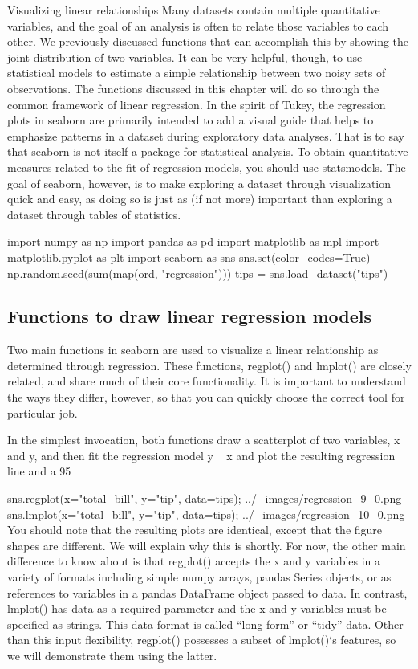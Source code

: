 Visualizing linear relationships
Many datasets contain multiple quantitative variables, and the goal of an analysis is often to relate those variables to each other. We previously discussed functions that can accomplish this by showing the joint distribution of two variables. It can be very helpful, though, to use statistical models to estimate a simple relationship between two noisy sets of observations. The functions discussed in this chapter will do so through the common framework of linear regression.
In the spirit of Tukey, the regression plots in seaborn are primarily intended to add a visual guide that helps to emphasize patterns in a dataset during exploratory data analyses. That is to say that seaborn is not itself a package for statistical analysis. To obtain quantitative measures related to the fit of regression models, you should use statsmodels. The goal of seaborn, however, is to make exploring a dataset through visualization quick and easy, as doing so is just as (if not more) important than exploring a dataset through tables of statistics.

import numpy as np
import pandas as pd
import matplotlib as mpl
import matplotlib.pyplot as plt
import seaborn as sns
sns.set(color_codes=True)
np.random.seed(sum(map(ord, "regression")))
tips = sns.load_dataset("tips")
\subsection{Functions to draw linear regression models}
Two main functions in seaborn are used to visualize a linear relationship as determined through regression. These functions, regplot() and lmplot() are closely related, and share much of their core functionality. It is important to understand the ways they differ, however, so that you can quickly choose the correct tool for particular job.

In the simplest invocation, both functions draw a scatterplot of two variables, x and y, and then fit the regression model y ~ x and plot the resulting regression line and a 95%

sns.regplot(x="total_bill", y="tip", data=tips);
../_images/regression_9_0.png
sns.lmplot(x="total_bill", y="tip", data=tips);
../_images/regression_10_0.png
You should note that the resulting plots are identical, except that the figure shapes are different. We will explain why this is shortly. For now, the other main difference to know about is that regplot() accepts the x and y variables in a variety of formats including simple numpy arrays, pandas Series objects, or as references to variables in a pandas DataFrame object passed to data. In contrast, lmplot() has data as a required parameter and the x and y variables must be specified as strings. This data format is called “long-form” or “tidy” data. Other than this input flexibility, regplot() possesses a subset of lmplot()‘s features, so we will demonstrate them using the latter.

